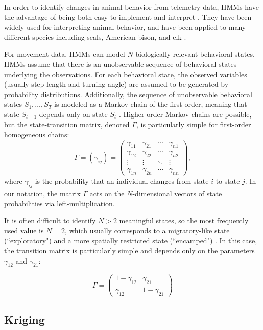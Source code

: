 \documentclass[12pt]{article}
\begin{document}
	In order to identify changes in animal behavior from telemetry data, HMMs have the advantage of being both easy to implement and interpret \cite{McClintock2018}. They have been widely used for interpreting animal behavior, and have been applied to many different species including seals, American bison, and elk \cite{Jonsen2005, McClintock2012, Morales2004}.
	
	For movement data, HMMs can model $N$ biologically relevant behavioral states. HMMs assume that there is an unobservable sequence of behavioral states underlying the observations. For each behavioral state, the observed variables (usually step length and turning angle) are assumed to be generated by probability distributions. Additionally, the sequence of unobservable behavioral states $S_1, \ldots, S_T$ is modeled as a Markov chain of the first-order, meaning that state $S_{t + 1}$ depends only on state $S_t$ \cite{Langrock2012}. Higher-order Markov chains are possible, but the state-transition matrix, denoted $\Gamma$, is particularly simple for first-order homogeneous chains:
	\[\Gamma = (\gamma_{ij}) = \begin{pmatrix} \gamma_{11} & \gamma_{21} & \cdots & \gamma_{n1} \\ \gamma_{12} & \gamma_{22} & \cdots & \gamma_{n2} \\ \vdots & \vdots & \ddots & \vdots \\ \gamma_{1n} & \gamma_{2n} &\cdots & \gamma_{nn} \end{pmatrix},\]
	where $\gamma_{ij}$ is the probability that an individual changes from state $i$ to state $j$. In our notation, the matrix $\Gamma$ acts on the $N$-dimensional vectors of state probabilities via left-multiplication.
	
	It is often difficult to identify $N > 2$ meaningful states, so the most frequently used value is $N = 2$, which usually corresponds to a migratory-like state (``exploratory") and a more spatially restricted state (``encamped") \cite{McClintock2018}. In this case, the transition matrix is particularly simple and depends only on the parameters $\gamma_{12}$ and $\gamma_{21}$:
	
	\[\Gamma = \begin{pmatrix} 1 - \gamma_{12} & \gamma_{21} \\ \gamma_{12} & 1 - \gamma_{21} \end{pmatrix}\]
	
	\subsection{Kriging} \label{sec:kriging}
	
\end{document}
